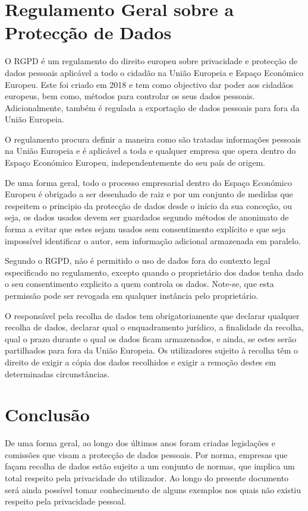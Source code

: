 \section{Regulamento Geral sobre a Protecção de Dados}
\label{chap4:RGPD}

O \ac{RGPD} é um regulamento do direito europeu sobre privacidade e protecção de dados pessoais aplicável a todo o cidadão na União Europeia e Espaço Económico Europeu. Este foi criado em 2018 e tem como objectivo dar poder aos cidadãos europeus, bem como, métodos para controlar os seus dados pessoais. Adicionalmente, também é regulada a exportação de dados pessoais para fora da União Europeia.

O regulamento procura definir a maneira como são tratadas informações pessoais na União Europeia e é aplicável a toda e qualquer empresa que opera dentro do Espaço Económico Europeu, independentemente do seu país de origem.

De uma forma geral, todo o processo empresarial dentro do Espaço Económico Europeu é obrigado a ser desenhado de raiz e por um conjunto de medidas que respeitem o principio da protecção de dados desde o início da sua conceção, ou seja,  os dados usados devem ser guardados segundo métodos de anonimato de forma a evitar que estes sejam usados sem consentimento explícito e que seja impossível identificar o autor, sem informação adicional armazenada em paralelo.

Segundo o \ac{RGPD}, não é permitido o uso de dados fora do contexto legal especificado no regulamento, excepto quando o proprietário dos dados tenha dado o seu consentimento explicito a quem controla os dados. Note-se, que esta permissão pode ser revogada em qualquer instância pelo proprietário.

O responsável pela recolha de dados tem obrigatoriamente que declarar qualquer recolha de dados, declarar qual o enquadramento jurídico, a finalidade da recolha, qual o prazo durante o qual os dados ficam armazenados, e ainda, se estes serão partilhados para fora da União Europeia. Os utilizadores sujeito à recolha têm o direito de exigir a cópia dos dados recolhidos e exigir a remoção destes em determinadas circunstâncias.

\section{Conclusão}
\label{chap4:conc}

De uma forma geral, ao longo dos últimos anos foram criadas legislações e comissões que visam a protecção de dados pessoais. Por norma, empresas que façam recolha de dados estão sujeito a um conjunto de normas, que implica um total respeito pela privacidade do utilizador. Ao longo do presente documento será ainda possível tomar conhecimento de alguns exemplos nos quais não existiu respeito pela privacidade pessoal.